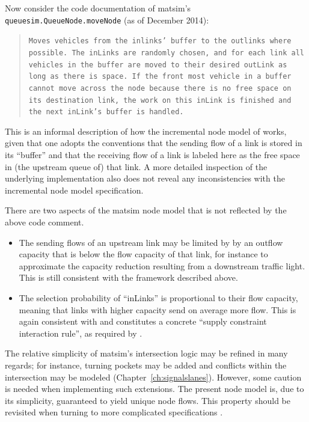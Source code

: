 Now consider the code documentation of \gls{matsim}'s \lstinline|queuesim.QueueNode.moveNode|
(as of December 2014):
\begin{quote}
\noindent \texttt{Moves vehicles from the inlinks' buffer to the outlinks
where possible. The inLinks are randomly chosen, and for each link
all vehicles in the buffer are moved to their desired outLink as long
as there is space. If the front most vehicle in a buffer cannot move
across the node because there is no free space on its destination
link, the work on this inLink is finished and the next inLink's buffer
is handled.}
\end{quote}
This is an informal description of how the incremental node model
of \citet{floetteroed-2011a} works, given that one adopts the conventions
that the sending flow of a link is stored in its {}``buffer'' and
that the receiving flow of a link is labeled here as the free space
in (the upstream queue of) that link. A more detailed inspection of
the underlying implementation also does not reveal any inconsistencies
with the incremental node model specification.

There are two aspects of the \gls{matsim} node model that is not reflected
by the above code comment.
\begin{itemize}\styleItemize
\item The sending flows of an upstream link may be limited by by an outflow
capacity that is below the flow capacity  of
that link, for instance to approximate the capacity reduction resulting
from a downstream traffic light. This is still consistent with the
framework described above.
\item The selection probability of {}``inLinks'' is proportional to their
flow capacity, meaning that links with higher capacity send on average
more flow. This is again consistent with \citet{floetteroed-2011a}
and constitutes a concrete {}``supply constraint interaction rule'',
as required by \citet{tampere-2010b}.
\end{itemize}
The relative simplicity of \gls{matsim}'s intersection logic may be refined
in many regards; for instance, turning pockets may be added and conflicts
within the intersection may be modeled (\cf Chapter~\ref{ch:signalslanes}). 
However, some caution is needed when implementing such extensions.
The present node model is, due to its simplicity, guaranteed to yield
unique node flows. This property should be revisited when turning
to more complicated specifications \citep{corthout-2012}.

